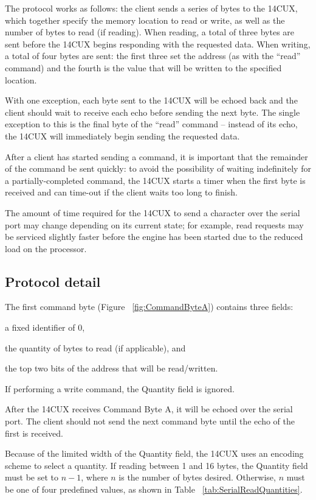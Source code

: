 \documentclass[11pt,twocolumn]{scrartcl}
\begin{document}
The protocol works as follows: the client sends a series of bytes to the 14CUX, which together specify the memory location to read or write, as well as the number of bytes to read (if reading). When reading, a total of three bytes are sent before the 14CUX begins responding with the requested data. When writing, a total of four bytes are sent: the first three set the address (as with the ``read'' command) and the fourth is the value that will be written to the specified location.

With one exception, each byte sent to the 14CUX will be echoed back and the client should wait to receive each echo before sending the next byte. The single exception to this is the final byte of the ``read'' command -- instead of its echo, the 14CUX will immediately begin sending the requested data.

After a client has started sending a command, it is important that the remainder of the command be sent quickly: to avoid the possibility of waiting indefinitely for a partially-completed command, the 14CUX starts a timer when the first byte is received and can time-out if the client waits too long to finish.

The amount of time required for the 14CUX to send a character over the serial port may change depending on its current state; for example, read requests may be serviced slightly faster before the engine has been started due to the reduced load on the processor.

\subsection {Protocol detail}

The first command byte (Figure ~\ref{fig:CommandByteA}) contains three fields:
\begin{inparaenum}
 \item a fixed identifier of 0,
 \item the quantity of bytes to read (if applicable), and
 \item the top two bits of the address that will be read/written.
\end{inparaenum}
If performing a write command, the Quantity field is ignored.

After the 14CUX receives Command Byte A, it will be echoed over the serial port. The client should not send the next command byte until the echo of the first is received.

Because of the limited width of the Quantity field, the 14CUX uses an encoding scheme to select a quantity. If reading between 1 and 16 bytes, the Quantity field must be set to $n-1$, where $n$ is the number of bytes desired. Otherwise, $n$ must be one of four predefined values, as shown in Table ~\ref{tab:SerialReadQuantities}.
\end{document}

